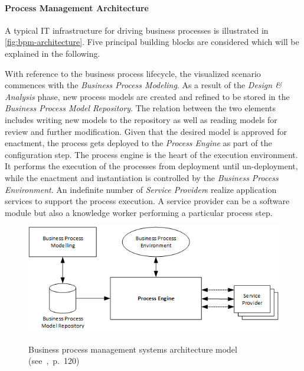 \paragraph{Process Management Architecture}
A typical IT infrastructure for driving business processes is illustrated in \autoref{fig:bpm-architecture}. 
Five principal building blocks are considered which will be explained in the following.

With reference to the business process lifecycle, the visualized scenario commences with the \emph{Business Process Modeling}. As a result of the \emph{Design \& Analysis} phase, new process models are created and refined to be stored in the \emph{Business Process Model Repository}. 
The relation between the two elements includes writing new models to the repository as well as reading models for review and further modification.
Given that the desired model is approved for enactment, the process gets deployed to the \emph{Process Engine} as part of the configuration step.
The process engine is the heart of the execution environment. It performs the execution of the processes from deployment until un-deployment, while the enactment and instantiation is controlled by the \emph{Business Process Environment}.
An indefinite number of \emph{Service Provider}s realize application services to support the process execution. A service provider can be a software module but also a knowledge worker performing a particular process step.

\begin{figure}[]
	\myfloatalign
	{\includegraphics[width=1\linewidth]{chapters/background/bpm-architecture.png}}
	\caption{Business process management systems architecture model (see~\cite{weske:bpm-book},~p.~120)}
	\label{fig:bpm-architecture}
\end{figure}


